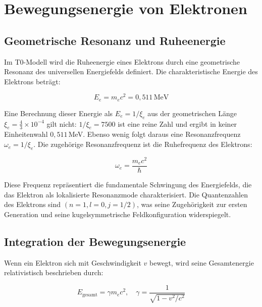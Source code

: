 	\section{Bewegungsenergie von Elektronen}
	\label{sec:electron_kinetic_energy}
	
	\subsection{Geometrische Resonanz und Ruheenergie}
	\label{subsec:electron_rest_energy}
	
	Im T0-Modell wird die Ruheenergie eines Elektrons durch eine geometrische Resonanz des universellen Energiefelds definiert. Die charakteristische Energie des Elektrons beträgt:
	
	\begin{equation}
		E_e = m_e c^2 = 0,511 \, \text{MeV}
	\end{equation}
	
	Eine Berechnung dieser Energie als $E_e = 1/\xi_e$ aus der geometrischen Länge $\xi_e = \frac{4}{3} \times 10^{-4}$ gilt nicht: $1/\xi_e = 7500$ ist eine reine Zahl und ergibt in keiner Einheitenwahl $0{,}511$\,MeV. Ebenso wenig folgt daraus eine Resonanzfrequenz $\omega_e = 1/\xi_e$. Die zugehörige Resonanzfrequenz ist die Ruhefrequenz des Elektrons:
	
	\begin{equation}
		\omega_e = \frac{m_e c^2}{\hbar}
	\end{equation}
	
	Diese Frequenz repräsentiert die fundamentale Schwingung des Energiefelds, die das Elektron als lokalisierte Resonanzmode charakterisiert. Die Quantenzahlen des Elektrons sind \((n=1, l=0, j=1/2)\), was seine Zugehörigkeit zur ersten Generation und seine kugelsymmetrische Feldkonfiguration widerspiegelt.
	
	\subsection{Integration der Bewegungsenergie}
	\label{subsec:electron_kinetic}
	
	Wenn ein Elektron sich mit Geschwindigkeit \( v \) bewegt, wird seine Gesamtenergie relativistisch beschrieben durch:
	
	\begin{equation}
		E_{\text{gesamt}} = \gamma m_e c^2, \quad \gamma = \frac{1}{\sqrt{1 - v^2/c^2}}
	\end{equation}
	
